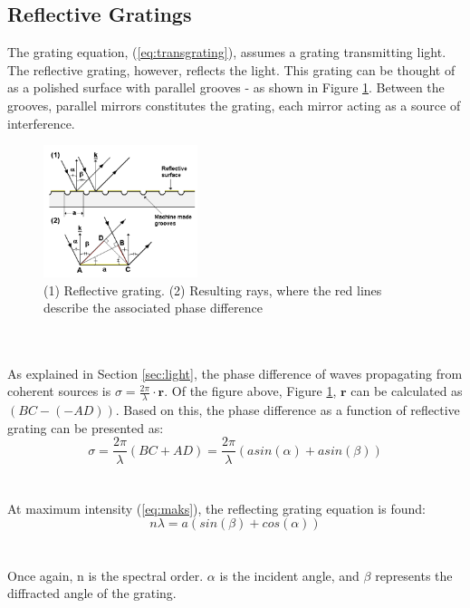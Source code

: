 \subsection{Reflective Gratings}
The grating equation, (\ref{eq:transgrating}), assumes a grating transmitting light. The reflective grating, however, reflects the light. This grating can be thought of as a polished surface with parallel grooves - as shown in Figure \ref{fig:refgrating}. Between the grooves, parallel mirrors constitutes the grating, each mirror acting as a source of interference. 
\begin{figure}[h]
    \centering
    \includegraphics[width=0.4\textwidth]{Images/theory/refgrating.png}
    \caption{(1) Reflective
grating. (2) Resulting rays, where the red lines describe the associated phase difference}
    \label{fig:refgrating}
\end{figure}
\\\\
As explained in Section \ref{sec:light}, the phase difference of waves propagating from coherent sources is $\sigma = \frac{2 \pi}{\lambda} \cdot \textbf{r}$. Of the figure above, Figure \ref{fig:refgrating}, $\textbf{r}$ can be calculated as $(BC - (-AD))$. Based on this, the phase difference as a function of reflective grating can be presented as:
\begin{equation}
    \sigma = \frac{2 \pi}{\lambda}(BC + AD) = \frac{2 \pi}{\lambda} (a sin(\alpha) + a sin(\beta))
\end{equation}
\\\\
At maximum intensity (\ref{eq:maks}), the reflecting grating equation is found:
\begin{equation}
    n \lambda = a (sin(\beta) + cos(\alpha))
    \label{eq:refgrating}
\end{equation}
\\\\
Once again, n is the spectral order. $\alpha$ is the incident angle, and $\beta$ represents the diffracted angle of the grating.
\\\\
